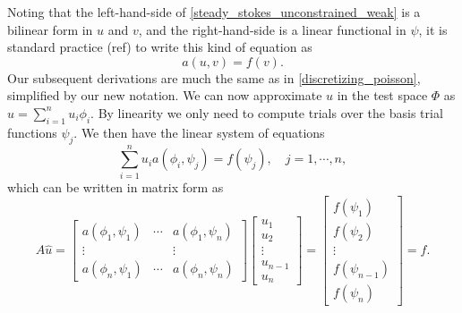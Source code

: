 \documentclass[11pt,a4paper]{memoir}
\newcommand{\inner}[1]{\left<#1\right>}
\begin{document}
Noting that the left-hand-side of \eqref{steady_stokes_unconstrained_weak} is a bilinear form in $u$ and $v$, and the right-hand-side
is a linear functional in $\psi$, it is standard practice (ref) to write this kind of equation as
\begin{equation}
    a(u, v) = f(v).
\end{equation}
Our subsequent derivations are much the same as in \ref{discretizing_poisson}, simplified by our new notation.
We can now approximate $u$ in the test space $\Phi$ as $\hat{u} = \sum_{i=1}^nu_i\phi_i$. By linearity we only need to compute
trials over the basis trial functions $\psi_j$.
We then have the linear system of equations
\begin{equation}\label{elliptic_bilinear_form}
    \sum_{i=1}^n u_i a\left(\phi_i, \psi_j\right) = f(\psi_j),\quad j=1,\cdots,n,
\end{equation}
which can be written in matrix form as
\begin{equation}\label{elliptic_bilinear_form_matrix}
    A\hat{u} = \begin{bmatrix}
            a(\phi_1, \psi_1) & \cdots & a(\phi_1, \psi_n) \\
            \vdots & & \vdots \\
            a(\phi_n, \psi_1) & \cdots & a(\phi_n, \psi_n)
            \end{bmatrix}
    \begin{bmatrix} u_1 \\ u_2 \\ \vdots \\ u_{n-1} \\ u_n \end{bmatrix}
    =
    \begin{bmatrix} f(\psi_1) \\ f(\psi_2) \\ \vdots \\ f(\psi_{n-1}) \\ f(\psi_{n}) \end{bmatrix}
    = \hat{f}.
\end{equation}
\end{document}
